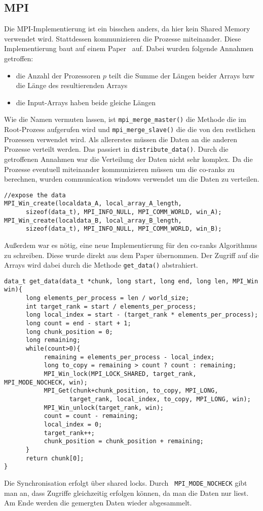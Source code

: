 \subsection{MPI}
Die MPI-Implementierung ist ein bisschen anders, da hier kein Shared Memory verwendet wird. Stattdessen kommunizieren die Prozesse miteinander. Diese Implementierung baut auf einem Paper~\cite{mpi} auf. Dabei wurden folgende Annahmen getroffen:
\begin{itemize}
\item die Anzahl der Prozessoren $p$ teilt die Summe der Längen beider Arrays bzw die Länge des resultierenden Arrays
\item die Input-Arrays haben beide gleiche Längen
\end{itemize}
Wie die Namen vermuten lassen, ist \verb|mpi_merge_master()| die Methode die im Root-Prozess aufgerufen wird und \verb|mpi_merge_slave()| die die von den restlichen Prozessen verwendet wird. Als allererstes müssen die Daten an die anderen Prozesse verteilt werden. Das passiert in \verb|distribute_data()|. Durch die getroffenen Annahmen war die Verteilung der Daten nicht sehr komplex. Da die Prozesse eventuell miteinander kommunizieren müssen um die co-ranks zu berechnen, wurden communication windows verwendet um die Daten zu verteilen.
\begin{verbatim}
//expose the data
MPI_Win_create(localdata_A, local_array_A_length, 
      sizeof(data_t), MPI_INFO_NULL, MPI_COMM_WORLD, win_A);
MPI_Win_create(localdata_B, local_array_B_length, 
      sizeof(data_t), MPI_INFO_NULL, MPI_COMM_WORLD, win_B);
\end{verbatim}
Außerdem war es nötig, eine neue Implementierung für den co-ranks Algorithmus zu schreiben. Diese wurde direkt aus dem Paper übernommen. Der Zugriff auf die Arrays wird dabei durch die Methode \verb|get_data()| abstrahiert. 
\begin{verbatim}
data_t get_data(data_t *chunk, long start, long end, long len, MPI_Win win){
      long elements_per_process = len / world_size;
      int target_rank = start / elements_per_process;
      long local_index = start - (target_rank * elements_per_process);
      long count = end - start + 1;
      long chunk_position = 0;
      long remaining;
      while(count>0){
           remaining = elements_per_process - local_index;
           long to_copy = remaining > count ? count : remaining;
           MPI_Win_lock(MPI_LOCK_SHARED, target_rank, MPI_MODE_NOCHECK, win);
           MPI_Get(chunk+chunk_position, to_copy, MPI_LONG, 
                  target_rank, local_index, to_copy, MPI_LONG, win);
           MPI_Win_unlock(target_rank, win);
           count = count - remaining;
           local_index = 0;
           target_rank++;
           chunk_position = chunk_position + remaining;
      }
      return chunk[0];
}
\end{verbatim}
Die Synchronisation erfolgt über shared locks. Durch \verb| MPI_MODE_NOCHECK| gibt man an, dass Zugriffe gleichzeitig erfolgen können, da man die Daten nur liest. Am Ende werden die gemergten Daten wieder abgesammelt.
